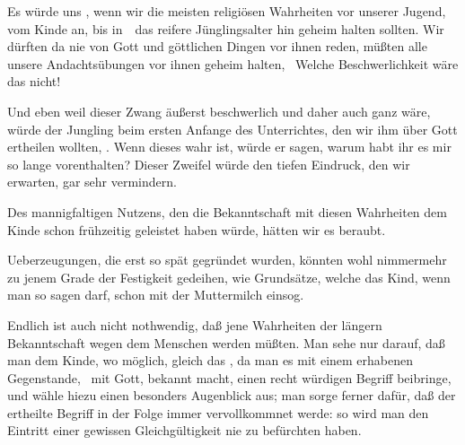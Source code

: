 \begin{aufzb} 
\item Es würde uns , wenn wir die meisten religiösen Wahrheiten vor unserer Jugend, vom Kinde an, bis in~\ das reifere Jünglingsalter hin geheim halten sollten. Wir dürften da nie von Gott und göttlichen Dingen vor ihnen reden, müßten alle unsere Andachtsübungen vor ihnen geheim halten, \usw\ Welche Beschwerlichkeit wäre das nicht!
\item Und eben weil dieser Zwang äußerst beschwerlich und daher auch ganz  wäre, würde der Jungling beim ersten Anfange des Unterrichtes, den wir ihm über Gott ertheilen wollten, . Wenn dieses wahr ist, würde er sagen, warum habt ihr es mir so lange vorenthalten? Dieser Zweifel würde den tiefen Eindruck, den wir erwarten, gar sehr vermindern.
\item Des mannigfaltigen Nutzens, den die Bekanntschaft mit diesen Wahrheiten dem Kinde schon frühzeitig geleistet haben würde, hätten wir es beraubt.
\item Ueberzeugungen, die erst so spät gegründet wurden, könnten wohl nimmermehr zu jenem Grade der Festigkeit gedeihen, wie Grundsätze, welche das Kind, wenn man so sagen darf, schon mit der Muttermilch einsog.
\item Endlich ist auch nicht nothwendig, daß jene Wahrheiten der längern Bekanntschaft wegen dem Menschen  werden müßten. Man sehe nur darauf, daß man dem Kinde, wo möglich, gleich das , da man es mit einem erhabenen Gegenstande, \zB\ mit Gott, bekannt macht, einen recht würdigen Begriff beibringe, und wähle hiezu einen besonders  Augenblick aus; man sorge ferner dafür, daß der ertheilte Begriff in der Folge immer vervollkommnet werde: so wird man den Eintritt einer gewissen Gleichgültigkeit nie zu befürchten haben.
\end{aufzb}


